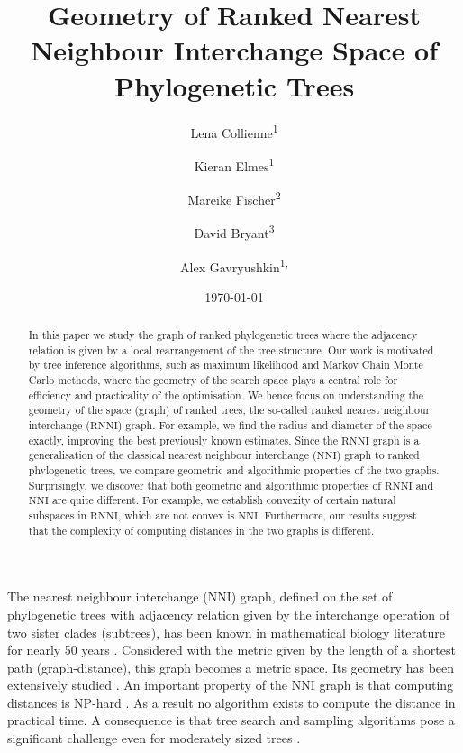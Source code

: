 \documentclass{amsart}
\title[Ranked Nearest Neighbour Intarchange]{Geometry of Ranked Nearest Neighbour Interchange Space of Phylogenetic Trees}
\date{\today}
\author{Lena Collienne\textsuperscript{1}}
\author{Kieran Elmes\textsuperscript{1}}
\author{Mareike Fischer\textsuperscript{2}}
\author{David Bryant\textsuperscript{3}}
\author{Alex Gavryushkin\textsuperscript{1, \Letter}}
\newcommand{\nni}{\mathrm{NNI}}
\newcommand{\rnni}{\mathrm{RNNI}}
\begin{document}
\begin{abstract}
In this paper we study the graph of ranked phylogenetic trees where the adjacency relation is given by a local rearrangement of the tree structure.
Our work is motivated by tree inference algorithms, such as maximum likelihood and Markov Chain Monte Carlo methods, where the geometry of the search space plays a central role for efficiency and practicality of the optimisation.
We hence focus on understanding the geometry of the space (graph) of ranked trees, the so-called ranked nearest neighbour interchange ($\rnni$) graph.
For example, we find the radius and diameter of the space exactly, improving the best previously known estimates.
Since the $\rnni$ graph is a generalisation of the classical nearest neighbour interchange ($\nni$) graph to ranked phylogenetic trees, we compare geometric and algorithmic properties of the two graphs.
Surprisingly, we discover that both geometric and algorithmic properties of $\rnni$ and $\nni$ are quite different.
For example, we establish convexity of certain natural subspaces in $\rnni$, which are not convex is $\nni$.
Furthermore, our results suggest that the complexity of computing distances in the two graphs is different.
\end{abstract}


\maketitle

The nearest neighbour interchange ($\nni$) graph, defined on the set of phylogenetic trees with adjacency relation given by the interchange operation of two sister clades (subtrees), has been known in mathematical biology literature for nearly 50 years \autocite{Robinson1971-ql,Moore1973-kk}.
Considered with the metric given by the length of a shortest path (graph-distance), this graph becomes a metric space.
Its geometry has been extensively studied \autocite{Dasgupta2000-xa, Li1996-zw, Gordon2013-fw, De_Jong2016-al}.
An important property of the $\nni$ graph is that computing distances is NP-hard \autocite{Dasgupta2000-xa}.
As a result no algorithm exists to compute the distance in practical time.
A consequence is that tree search and sampling algorithms pose a significant challenge even for moderately sized trees
\autocite{Whidden2016-kl}.
\end{document}
